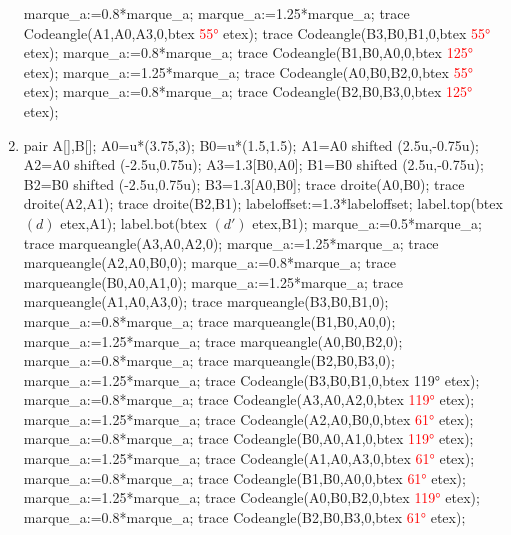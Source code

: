 \begin{corrige}
\begin{enumerate}
\begin{Geometrie}[CoinHD={(6u,4u)}]
         marque_a:=0.8*marque_a;
         marque_a:=1.25*marque_a;
         trace Codeangle(A1,A0,A3,0,btex \textcolor{red}{\ang{55}} etex);
         trace Codeangle(B3,B0,B1,0,btex \textcolor{red}{\ang{55}} etex);
         marque_a:=0.8*marque_a;
         trace Codeangle(B1,B0,A0,0,btex \textcolor{red}{\ang{125}} etex);
         marque_a:=1.25*marque_a;
         trace Codeangle(A0,B0,B2,0,btex \textcolor{red}{\ang{55}} etex);
         marque_a:=0.8*marque_a;
         trace Codeangle(B2,B0,B3,0,btex \textcolor{red}{\ang{125}} etex);         
      \end{Geometrie}
      \item \phantom{rrr}\par
      \begin{Geometrie}[CoinHD={(7u,4u)}]
         pair A[],B[];
         A0=u*(3.75,3);
         B0=u*(1.5,1.5);
         A1=A0 shifted (2.5u,-0.75u);
         A2=A0 shifted (-2.5u,0.75u);
         A3=1.3[B0,A0];
         B1=B0 shifted (2.5u,-0.75u);
         B2=B0 shifted (-2.5u,0.75u);
         B3=1.3[A0,B0];
         trace droite(A0,B0);
         trace droite(A2,A1);
         trace droite(B2,B1);
         labeloffset:=1.3*labeloffset;
         label.top(btex $(d)$ etex,A1);
         label.bot(btex $(d')$ etex,B1);         
         marque_a:=0.5*marque_a;
         trace marqueangle(A3,A0,A2,0);
         marque_a:=1.25*marque_a;
         trace marqueangle(A2,A0,B0,0);
         marque_a:=0.8*marque_a;
         trace marqueangle(B0,A0,A1,0);
         marque_a:=1.25*marque_a;
         trace marqueangle(A1,A0,A3,0);
         trace marqueangle(B3,B0,B1,0);
         marque_a:=0.8*marque_a;
         trace marqueangle(B1,B0,A0,0);
         marque_a:=1.25*marque_a;
         trace marqueangle(A0,B0,B2,0);
         marque_a:=0.8*marque_a;
         trace marqueangle(B2,B0,B3,0);
         marque_a:=1.25*marque_a;
         trace Codeangle(B3,B0,B1,0,btex \ang{119} etex);         
         marque_a:=0.8*marque_a;
         trace Codeangle(A3,A0,A2,0,btex \textcolor{red}{\ang{119}} etex);
         marque_a:=1.25*marque_a;
         trace Codeangle(A2,A0,B0,0,btex \textcolor{red}{\ang{61}} etex);
         marque_a:=0.8*marque_a;
         trace Codeangle(B0,A0,A1,0,btex \textcolor{red}{\ang{119}} etex);
         marque_a:=1.25*marque_a;
         trace Codeangle(A1,A0,A3,0,btex \textcolor{red}{\ang{61}} etex);
         marque_a:=0.8*marque_a;
         trace Codeangle(B1,B0,A0,0,btex \textcolor{red}{\ang{61}} etex);
         marque_a:=1.25*marque_a;
         trace Codeangle(A0,B0,B2,0,btex \textcolor{red}{\ang{119}} etex);
         marque_a:=0.8*marque_a;
         trace Codeangle(B2,B0,B3,0,btex \textcolor{red}{\ang{61}} etex);         
      \end{Geometrie}
   \end{enumerate}
\end{corrige}